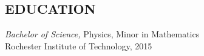 \documentclass[margin]{res}
\begin{document}
\begin{resume}

\section{EDUCATION}
  {\sl Bachelor of Science,} Physics, Minor in Mathematics \\
  Rochester Institute of Technology, 2015	\\



\end{resume}
\end{document}

